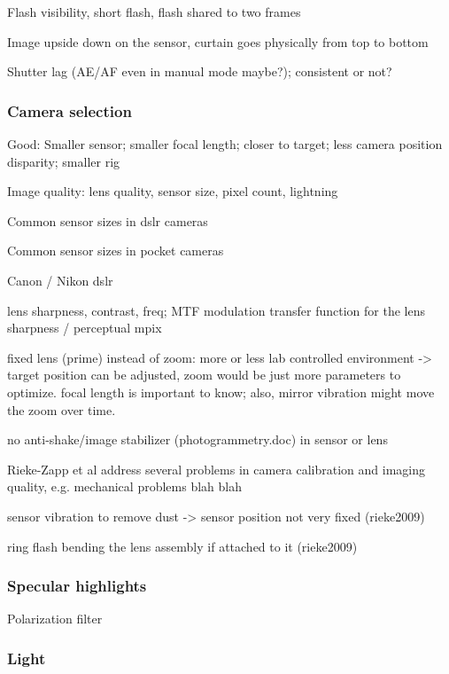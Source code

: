 Flash visibility, short flash, flash shared to two frames

Image upside down on the sensor, curtain goes physically from top to bottom

Shutter lag (AE/AF even in manual mode maybe?); consistent or not?

\subsubsection{Camera selection}

Good: Smaller sensor; smaller focal length; closer to target; less camera position disparity; smaller rig

Image quality: lens quality, sensor size, pixel count, lightning

Common sensor sizes in dslr cameras

Common sensor sizes in pocket cameras

Canon / Nikon dslr


lens sharpness, contrast, freq; MTF modulation transfer function for the lens sharpness / perceptual mpix

fixed lens (prime) instead of zoom: more or less lab controlled environment -> target position can be adjusted, zoom would be just more parameters to optimize. focal length is important to know; also, mirror vibration might move the zoom over time.

no anti-shake/image stabilizer  (photogrammetry.doc) in sensor or lens

Rieke-Zapp et al \cite{rieke2009evaluation} address several problems in camera calibration and imaging quality, e.g. mechanical problems blah blah

sensor vibration to remove dust -> sensor position not very fixed (rieke2009)

ring flash bending the lens assembly if attached to it (rieke2009)


\subsubsection{Specular highlights}

Polarization filter

\subsubsection{Light}

